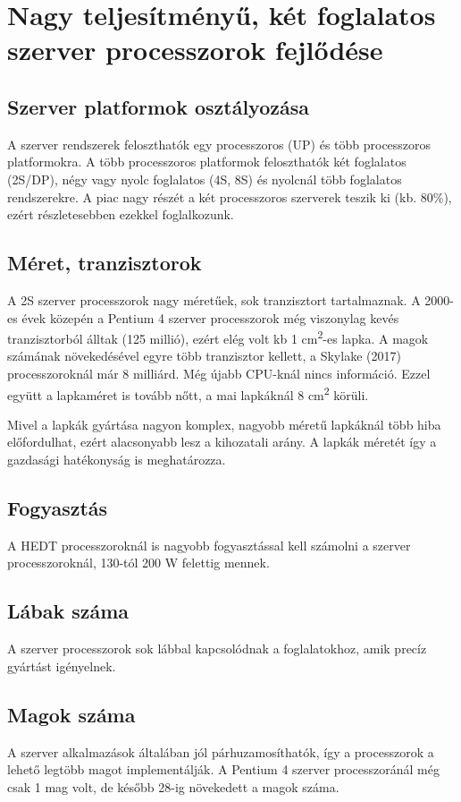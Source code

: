 
\chapter{Nagy teljesítményű, két foglalatos szerver processzorok fejlődése}

\section{Szerver platformok osztályozása}
A szerver rendszerek feloszthatók egy processzoros (UP) és több processzoros platformokra.
A több processzoros platformok feloszthatók két foglalatos (2S/DP), négy vagy nyolc foglalatos (4S, 8S) és nyolcnál több foglalatos rendszerekre.
A piac nagy részét a két processzoros szerverek teszik ki (kb. 80\%), ezért részletesebben ezekkel foglalkozunk.

\section{Méret, tranzisztorok}
A 2S szerver processzorok nagy méretűek, sok tranzisztort tartalmaznak.
A 2000-es évek közepén a Pentium 4 szerver processzorok még viszonylag kevés tranzisztorból álltak (125 millió), ezért elég volt kb 1 cm\textsuperscript{2}-es lapka.
A magok számának növekedésével egyre több tranzisztor kellett, a Skylake (2017) processzoroknál már 8 milliárd.
Még újabb CPU-knál nincs információ.
Ezzel együtt a lapkaméret is tovább nőtt, a mai lapkáknál 8 cm\textsuperscript{2} körüli.

Mivel a lapkák gyártása nagyon komplex, nagyobb méretű lapkáknál több hiba előfordulhat, ezért alacsonyabb lesz a kihozatali arány.
A lapkák méretét így a gazdasági hatékonyság is meghatározza.

\section{Fogyasztás}
A HEDT processzoroknál is nagyobb fogyasztással kell számolni a szerver processzoroknál, 130-tól 200 W felettig mennek.

\section{Lábak száma}
A szerver processzorok sok lábbal kapcsolódnak a foglalatokhoz, amik precíz gyártást igényelnek.

\section{Magok száma}
A szerver alkalmazások általában jól párhuzamosíthatók, így a processzorok a lehető legtöbb magot implementálják.
A Pentium 4 szerver processzoránál még csak 1 mag volt, de később 28-ig növekedett a magok száma.

